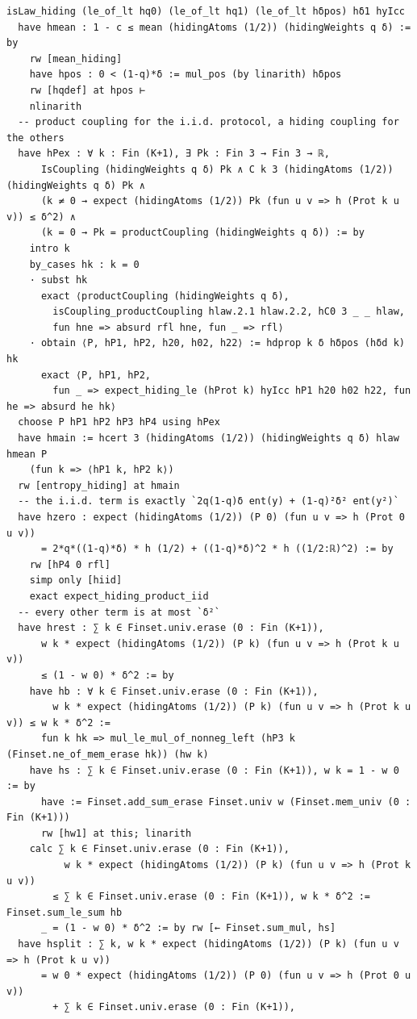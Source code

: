 \documentclass[11pt,a4paper]{article}
\theoremstyle{definition}
\theoremstyle{remark}
\begin{document}
\begin{Verbatim}[fontsize=\scriptsize,formatcom=\leanmono,samepage=false]
    isLaw_hiding (le_of_lt hq0) (le_of_lt hq1) (le_of_lt hδpos) hδ1 hyIcc
  have hmean : 1 - c ≤ mean (hidingAtoms (1/2)) (hidingWeights q δ) := by
    rw [mean_hiding]
    have hpos : 0 < (1-q)*δ := mul_pos (by linarith) hδpos
    rw [hqdef] at hpos ⊢
    nlinarith
  -- product coupling for the i.i.d. protocol, a hiding coupling for the others
  have hPex : ∀ k : Fin (K+1), ∃ Pk : Fin 3 → Fin 3 → ℝ,
      IsCoupling (hidingWeights q δ) Pk ∧ C k 3 (hidingAtoms (1/2)) (hidingWeights q δ) Pk ∧
      (k ≠ 0 → expect (hidingAtoms (1/2)) Pk (fun u v => h (Prot k u v)) ≤ δ^2) ∧
      (k = 0 → Pk = productCoupling (hidingWeights q δ)) := by
    intro k
    by_cases hk : k = 0
    · subst hk
      exact ⟨productCoupling (hidingWeights q δ),
        isCoupling_productCoupling hlaw.2.1 hlaw.2.2, hC0 3 _ _ hlaw,
        fun hne => absurd rfl hne, fun _ => rfl⟩
    · obtain ⟨P, hP1, hP2, h20, h02, h22⟩ := hdprop k δ hδpos (hδd k) hk
      exact ⟨P, hP1, hP2,
        fun _ => expect_hiding_le (hProt k) hyIcc hP1 h20 h02 h22, fun he => absurd he hk⟩
  choose P hP1 hP2 hP3 hP4 using hPex
  have hmain := hcert 3 (hidingAtoms (1/2)) (hidingWeights q δ) hlaw hmean P
    (fun k => ⟨hP1 k, hP2 k⟩)
  rw [entropy_hiding] at hmain
  -- the i.i.d. term is exactly `2q(1-q)δ ent(y) + (1-q)²δ² ent(y²)`
  have hzero : expect (hidingAtoms (1/2)) (P 0) (fun u v => h (Prot 0 u v))
      = 2*q*((1-q)*δ) * h (1/2) + ((1-q)*δ)^2 * h ((1/2:ℝ)^2) := by
    rw [hP4 0 rfl]
    simp only [hiid]
    exact expect_hiding_product_iid
  -- every other term is at most `δ²`
  have hrest : ∑ k ∈ Finset.univ.erase (0 : Fin (K+1)),
      w k * expect (hidingAtoms (1/2)) (P k) (fun u v => h (Prot k u v))
      ≤ (1 - w 0) * δ^2 := by
    have hb : ∀ k ∈ Finset.univ.erase (0 : Fin (K+1)),
        w k * expect (hidingAtoms (1/2)) (P k) (fun u v => h (Prot k u v)) ≤ w k * δ^2 :=
      fun k hk => mul_le_mul_of_nonneg_left (hP3 k (Finset.ne_of_mem_erase hk)) (hw k)
    have hs : ∑ k ∈ Finset.univ.erase (0 : Fin (K+1)), w k = 1 - w 0 := by
      have := Finset.add_sum_erase Finset.univ w (Finset.mem_univ (0 : Fin (K+1)))
      rw [hw1] at this; linarith
    calc ∑ k ∈ Finset.univ.erase (0 : Fin (K+1)),
          w k * expect (hidingAtoms (1/2)) (P k) (fun u v => h (Prot k u v))
        ≤ ∑ k ∈ Finset.univ.erase (0 : Fin (K+1)), w k * δ^2 := Finset.sum_le_sum hb
      _ = (1 - w 0) * δ^2 := by rw [← Finset.sum_mul, hs]
  have hsplit : ∑ k, w k * expect (hidingAtoms (1/2)) (P k) (fun u v => h (Prot k u v))
      = w 0 * expect (hidingAtoms (1/2)) (P 0) (fun u v => h (Prot 0 u v))
        + ∑ k ∈ Finset.univ.erase (0 : Fin (K+1)),

\end{Verbatim}
\end{document}
